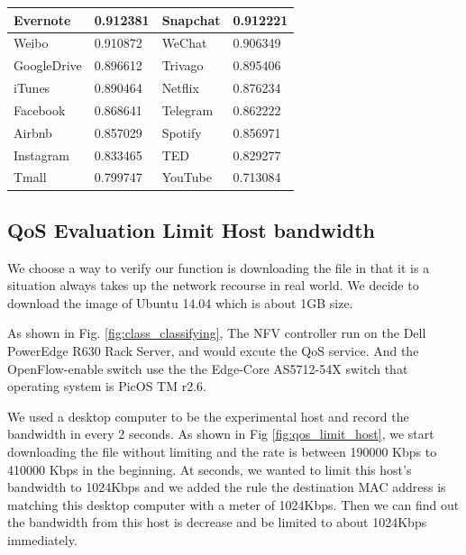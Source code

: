\documentclass[journal]{IEEEtran}
\begin{document}
\begin{table}[!t]
\begin{tabular}{|l|l|l|l|}
Evernote            & 0.912381            & Snapchat          & 0.912221            \\ \hline
Weibo               & 0.910872            & WeChat            & 0.906349            \\ \hline
GoogleDrive         & 0.896612            & Trivago           & 0.895406             \\ \hline
iTunes              & 0.890464            & Netflix           & 0.876234             \\ \hline
Facebook            & 0.868641            & Telegram          & 0.862222             \\ \hline
Airbnb              & 0.857029            & Spotify           & 0.856971             \\ \hline
Instagram           & 0.833465            & TED               & 0.829277             \\ \hline
Tmall               & 0.799747            & YouTube           & 0.713084             \\ \hline
\end{tabular}
\end{table}

\subsection{QoS Evaluation Limit Host bandwidth}

We choose a way to verify our function is downloading the file in that it is a situation always takes up the network recourse in real world. We decide to download the image of Ubuntu 14.04 which is about 1GB size.

As shown in Fig. \ref{fig:class_classifying}, The NFV controller run on the Dell PowerEdge R630 Rack Server, and would excute the QoS service. And the OpenFlow-enable switch use the the Edge-Core AS5712-54X switch that operating system is PicOS TM r2.6.

We used a desktop computer to be the experimental host and record the bandwidth in every 2 seconds. As shown in Fig \ref{fig:qos_limit_host}, we start downloading the file without limiting and the rate is between 190000 Kbps to 410000 Kbps in the beginning.
At  seconds, we wanted to limit this host’s bandwidth to 1024Kbps and we added the rule the destination MAC address is matching this desktop computer with a meter of 1024Kbps. Then we can find out the bandwidth from this host is decrease and be limited to about 1024Kbps immediately.
\end{document}
